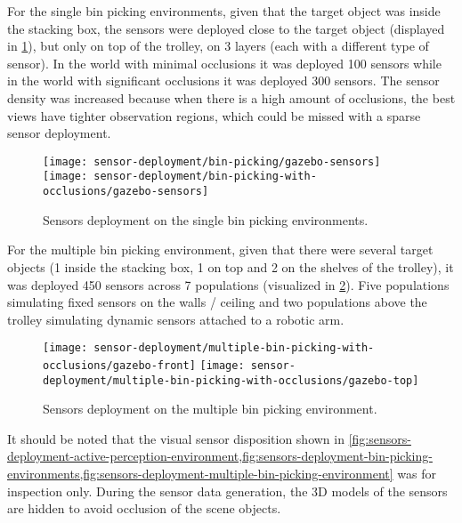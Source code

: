 For the single bin picking environments, given that the target object was inside the stacking box, the sensors were deployed close to the target object (displayed in \cref{fig:sensors-deployment-bin-picking-environments}), but only on top of the trolley, on 3 layers (each with a different type of sensor). In the world with minimal occlusions it was deployed 100 sensors while in the world with significant occlusions it was deployed 300 sensors. The sensor density was increased because when there is a high amount of occlusions, the best views have tighter observation regions, which could be missed with a sparse sensor deployment.

\begin{figure}
	\centering
	\texttt{[image: sensor-deployment/bin-picking/gazebo-sensors]}\hspace{1em}
	\texttt{[image: sensor-deployment/bin-picking-with-occlusions/gazebo-sensors]}
	\caption{Sensors deployment on the single bin picking environments.}
	\label{fig:sensors-deployment-bin-picking-environments}
\end{figure}

For the multiple bin picking environment, given that there were several target objects (1 inside the stacking box, 1 on top and 2 on the shelves of the trolley), it was deployed 450 sensors across 7 populations (visualized in \cref{fig:sensors-deployment-multiple-bin-picking-environment}). Five populations simulating fixed sensors on the walls / ceiling and two populations above the trolley simulating dynamic sensors attached to a robotic arm.

\begin{figure}
	\centering
	\texttt{[image: sensor-deployment/multiple-bin-picking-with-occlusions/gazebo-front]}\hspace{0.25em}
	\texttt{[image: sensor-deployment/multiple-bin-picking-with-occlusions/gazebo-top]}
	\caption{Sensors deployment on the multiple bin picking environment.}
	\label{fig:sensors-deployment-multiple-bin-picking-environment}
\end{figure}

It should be noted that the visual sensor disposition shown in \cref{fig:sensors-deployment-active-perception-environment,fig:sensors-deployment-bin-picking-environments,fig:sensors-deployment-multiple-bin-picking-environment} was for inspection only. During the sensor data generation, the 3D models of the sensors are hidden to avoid occlusion of the scene objects.
